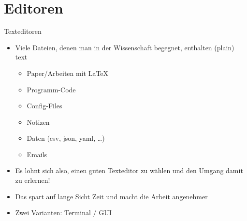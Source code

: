 \section{Editoren}




\begin{frame}{Texteditoren}
  \begin{itemize}
    \item Viele Dateien, denen man in der Wissenschaft begegnet, enthalten (plain) text
      \begin{itemize}
        \item Paper/Arbeiten mit \LaTeX
        \item Programm-Code
        \item Config-Files
        \item Notizen
        \item Daten (csv, json, yaml, …)
        \item Emails
      \end{itemize}
    \item Es lohnt sich also, einen guten Texteditor zu wählen und den Umgang damit zu erlernen!
    \item Das spart auf lange Sicht Zeit und macht die Arbeit angenehmer
    \item Zwei Varianten: Terminal / GUI
  \end{itemize}
\end{frame}

